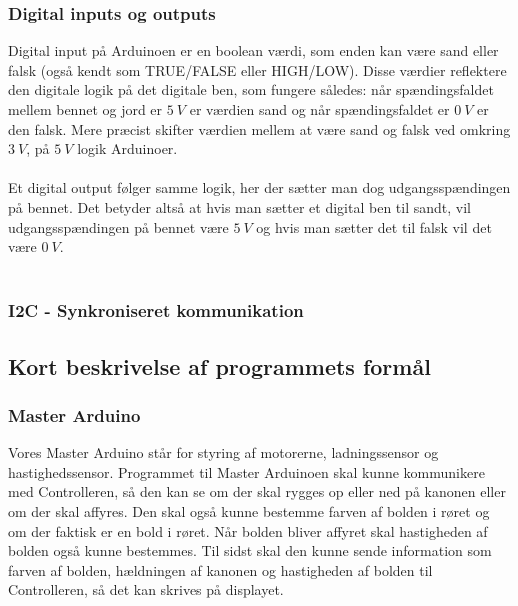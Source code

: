 \subsubsection{Digital inputs og outputs}
Digital input på Arduinoen er en boolean værdi, som enden kan være sand eller falsk (også kendt som TRUE/FALSE eller HIGH/LOW). Disse værdier reflektere den digitale logik på det digitale ben, som fungere således: når spændingsfaldet mellem bennet og jord er $\SI{5}{V}$ er værdien sand og når spændingsfaldet er $\SI{0}{V}$ er den falsk. Mere præcist skifter værdien mellem at være sand og falsk ved omkring $\SI{3}{V}$, på $\SI{5}{V}$ logik Arduinoer. \cite{arduino:dig}\\
\\
Et digital output følger samme logik, her der sætter man dog udgangsspændingen på bennet. Det betyder altså at hvis man sætter et digital ben til sandt, vil udgangsspændingen på bennet være $\SI{5}{V}$ og hvis man sætter det til falsk vil det være $\SI{0}{V}$. \cite{arduino:dig}\\
\\


\subsubsection{I2C - Synkroniseret kommunikation}


\subsection{Kort beskrivelse af programmets formål}
\subsubsection{Master Arduino}
Vores Master Arduino står for styring af motorerne, ladningssensor og hastighedssensor. Programmet til Master Arduinoen skal kunne kommunikere med Controlleren, så den kan se om der skal rygges op eller ned på kanonen eller om der skal affyres. Den skal også kunne bestemme farven af bolden i røret og om der faktisk er en bold i røret. Når bolden bliver affyret skal hastigheden af bolden også kunne bestemmes. Til sidst skal den kunne sende information som farven af bolden, hældningen af kanonen og hastigheden af bolden til Controlleren, så det kan skrives på displayet.
